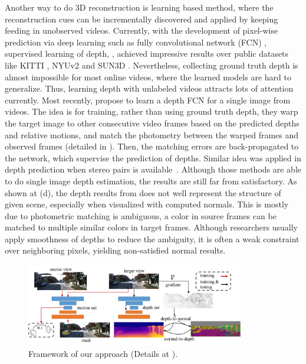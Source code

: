 Another way to do 3D reconstruction is learning based method, where the reconstruction cues can be incrementally discovered and applied by keeping feeding in unobserved videos. Currently, with the development of pixel-wise prediction via deep learning such as fully convolutional network (FCN) \cite{long2015fully}, supervised learning of depth, \eg \cite{eigen2014depth,ummenhofer2016demon}, achieved impressive results over public datasets like KITTI \cite{geiger2012we}, NYUv2 \cite{silberman2012indoor} and SUN3D \cite{xiao2013sun3d}. 
Nevertheless, collecting ground truth depth is almost impossible for most online videos, where the learned models are hard to generalize. 
Thus, learning depth with unlabeled videos attracts lots of attention currently. Most recently,
\cite{zhou2017unsupervised} propose to learn a depth FCN for a single image from videos. The idea is for training, rather than using ground truth depth, they warp the target image to other consecutive video frames based on the predicted depths and relative motions, and match the photometry between the warped frames and observed frames (detailed in ). Then, the matching errors are back-propagated to the network, which supervise the prediction of depths. Similar idea was applied in depth prediction when stereo pairs is available~\cite{GargBR16,godard2016unsupervised}.
Although those methods are able to do single image depth estimation, the results are still far from satisfactory. As shown at (d), the depth results from \cite{zhou2017unsupervised} does not well represent the structure of given scene, especially when visualized with computed normals. 
This is mostly due to photometric matching is ambiguous, \ie a color in source frames can be matched to multiple similar colors in target frames. Although researchers usually apply smoothness of depths \cite{zhou2017unsupervised} to reduce the ambiguity, it is often a weak constraint over neighboring pixels, yielding non-satisfied normal results.

\begin{figure}[t]
\centering
\includegraphics[width=0.85\textwidth]{figures/pipeline_comp.pdf}
\caption{Framework of our approach (Details at ).}
\label{fig:pipeline}
\vspace{-1.3\baselineskip}
\end{figure}

